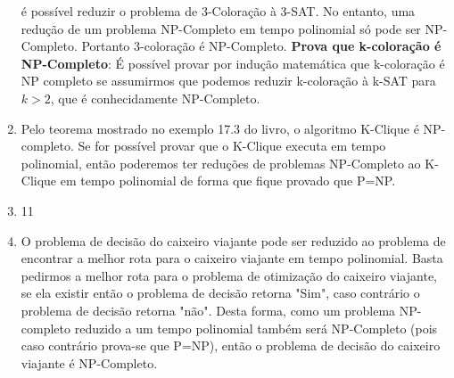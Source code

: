 \documentclass[11pt]{article}
\begin{document}
\begin{enumerate}
        é possível reduzir o problema de 3-Coloração à 3-SAT. No entanto, uma
        redução de um problema NP-Completo em tempo polinomial só pode ser
        NP-Completo. Portanto 3-coloração é NP-Completo. \textbf{Prova que
        k-coloração é NP-Completo}: É possível provar por indução matemática
        que k-coloração é NP completo se assumirmos que podemos reduzir
        k-coloração à k-SAT para $k>2$, que é conhecidamente NP-Completo.
    \item Pelo teorema mostrado no exemplo 17.3 do livro, o algoritmo K-Clique
        é NP-completo. Se for possível provar que o K-Clique executa em tempo
        polinomial, então poderemos ter reduções de problemas NP-Completo ao
        K-Clique em tempo polinomial de forma que fique provado que P=NP.
    \item 11
    \item O problema de decisão do caixeiro viajante pode ser reduzido ao
        problema de encontrar a melhor rota para o caixeiro viajante em tempo
        polinomial. Basta pedirmos a melhor rota para o problema de otimização
        do caixeiro viajante, se ela existir então o problema de decisão
        retorna "Sim", caso contrário o problema de decisão retorna "não".
        Desta forma, como um problema NP-completo reduzido a um tempo
        polinomial também será NP-Completo (pois caso contrário prova-se que
        P=NP), então o problema de decisão do caixeiro viajante é NP-Completo.
\end{enumerate}

\end{document}
